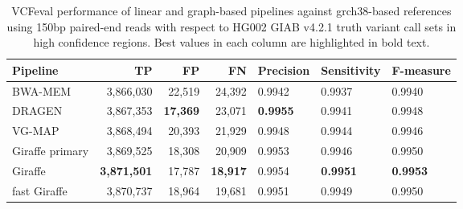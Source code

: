 \documentclass[11pt]{ucscthesis}
\begin{document}
\begin{table}[H]
    \centering
    \begin{tabular}{|l|r|r|r|l|l|l|}
     \hline
    Pipeline                    & TP                 & FP              & FN              & Precision       & Sensitivity     & F-measure       \\
     \hline
    BWA-MEM                     & 3,866,030          & 22,519          & 24,392          & 0.9942          & 0.9937          & 0.9940          \\
    DRAGEN                      & 3,867,353          & \textbf{17,369} & 23,071          & \textbf{0.9955} & 0.9941          & 0.9948
         \\
    VG-MAP                      & 3,868,494          & 20,393          & 21,929          & 0.9948          & 0.9944          & 0.9946          \\
    Giraffe primary             & 3,869,525          & 18,308          & 20,909          & 0.9953          & 0.9946          & 0.9950          \\
    Giraffe                     & \textbf{3,871,501} & 17,787          & \textbf{18,917} & 0.9954          & \textbf{0.9951} & \textbf{0.9953} \\
    fast Giraffe                & 3,870,737          & 18,964          & 19,681          & 0.9951          & 0.9949          & 0.9950          \\
    \hline
    \end{tabular}
\caption[Genotyping evaluation with VCFeval in HG002 using 150bp paired-end reads against the grch38-based graph reference]{VCFeval performance of linear and graph-based pipelines against grch38-based references using 150bp paired-end reads with respect to HG002 GIAB v4.2.1 truth variant call sets in high confidence regions. Best values in each column are highlighted in bold text.}
\label{tab:vcfeval_high_conf_2x150_hg002_grch38}
\end{table}
\end{document}

